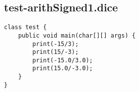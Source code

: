 \subsection{test-arithSigned1.dice}
\begin{verbatim}
class test {
	public void main(char[][] args) {
		print(-15/3);
		print(15/-3);
		print(-15.0/3.0);
		print(15.0/-3.0);
	}
}
\end{verbatim}